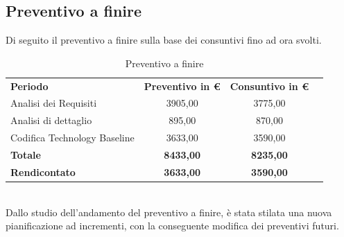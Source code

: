 \newpage

\subsection{Preventivo a finire}
Di seguito il preventivo a finire sulla base dei consuntivi fino ad ora svolti.
\begin{table} [h!]
	\begin{center}
		\begin{tabular} { m{4 cm} c c c  }
			\rowcolor{lightgray}
			\textbf{Periodo}  & \textbf{Preventivo in \euro} & \textbf{Consuntivo in \euro} \\
			Analisi dei Requisiti   			& 3905,00     & 3775,00 \\
			Analisi di dettaglio  				& 895,00     & 870,00 \\
			Codifica Technology Baseline        & 3633,00     & 3590,00 \\
			\textbf{Totale}     & \textbf{8433,00}         & \textbf{8235,00}   \\
			\textbf{Rendicontato}  & \textbf{3633,00}          & \textbf{3590,00}   \\
			
			
		\end{tabular}
		\caption{Preventivo a finire }
	\end{center}
\end{table}
 \\
Dallo studio dell'andamento del preventivo a finire, è stata stilata una nuova pianificazione ad incrementi, con la conseguente modifica dei preventivi futuri.